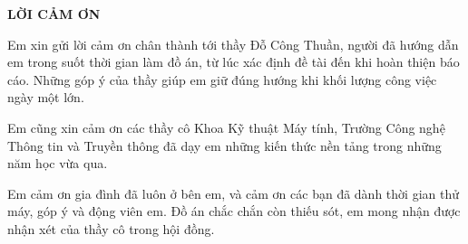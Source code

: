 \documentclass[../DoAn.tex]{subfiles}
\begin{document}
\begin{center}
    \Large{\textbf{LỜI CẢM ƠN}}\\
\end{center}
\vspace{1cm}

Em xin gửi lời cảm ơn chân thành tới thầy Đỗ Công Thuần, người đã hướng dẫn em
trong suốt thời gian làm đồ án, từ lúc xác định đề tài đến khi hoàn thiện
báo cáo. Những góp ý của thầy giúp em giữ đúng hướng khi khối lượng công
việc ngày một lớn.

Em cũng xin cảm ơn các thầy cô Khoa Kỹ thuật Máy tính, Trường Công nghệ
Thông tin và Truyền thông đã dạy em những kiến thức nền tảng trong những
năm học vừa qua.

Em cảm ơn gia đình đã luôn ở bên em, và cảm ơn các bạn đã dành thời gian
thử máy, góp ý và động viên em. Đồ án chắc chắn còn thiếu sót, em mong
nhận được nhận xét của thầy cô trong hội đồng.
\end{document}
